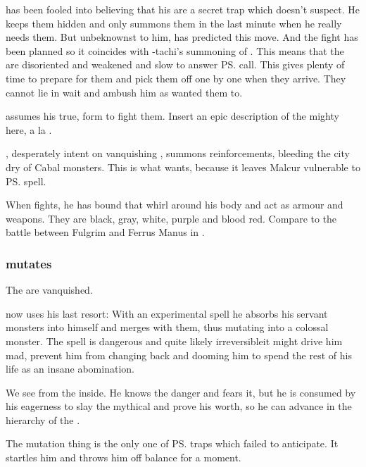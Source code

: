 \begin{garbage}
\Teshrial{} has been fooled into believing that his \ghobaleth{} are a secret trap which \Ishnaruchaefir{} doesn't suspect. 
He keeps them hidden and only summons them in the last minute when he really needs them. 
But unbeknownst to him, \Ishnaruchaefir{} has predicted this move. 
And the fight has been planned so it coincides with \Psyrex-tachi's summoning of \Nithdornazsh. 
This means that the \ghobaleth{} are disoriented and weakened and slow to answer \ps{\Teshrial} call. 
This gives \Ishnaruchaefir{} plenty of time to prepare for them and pick them off one by one when they arrive. 
They cannot lie in wait and ambush him as \Teshrial{} wanted them to. 

\Ishnaruchaefir{} assumes his true, \draconian{} form to fight them. 
Insert an epic description of the mighty \dragon{} here, a la . 

\Teshrial{}, desperately intent on vanquishing \Ishnaruchaefir{}, summons reinforcements, bleeding the city dry of Cabal monsters. 
This is what \Ishnaruchaefir{} wants, because it leaves Malcur vulnerable to \ps{\Psyrex}{} spell. 

When \Ishnaruchaefir{} fights, he has bound \daemons{} that whirl around his body and act as armour and weapons. 
They are black, gray, white, purple and blood red. 
Compare to the battle between Fulgrim and Ferrus Manus in . 





\subsubsection{\Teshrial{} mutates}
The \ghobaleth{} are vanquished. 

\Teshrial{} now uses his last resort: With an experimental spell he absorbs his servant monsters into himself and merges with them, thus mutating into a colossal monster. The spell is dangerous and quite likely irreversible\dash it might drive him mad, prevent him from changing back and dooming him to spend the rest of his life as an insane abomination. 

We see \Teshrial{} from the inside. He knows the danger and fears it, but he is consumed by his eagerness to slay the mythical \Ishnaruchaefir{} and prove his worth, so he can advance in the hierarchy of the \ketherain. 

The mutation thing is the only one of \ps{\Teshrial} traps which \Ishnaruchaefir{} failed to anticipate. 
It startles him and throws him off balance for a moment. 


\end{garbage}
